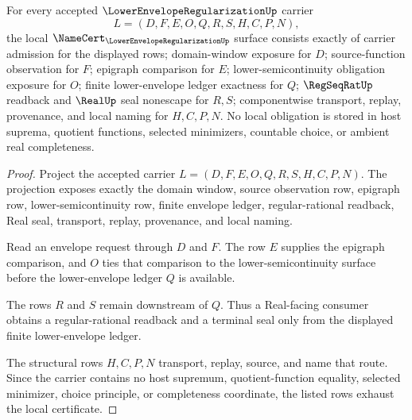 \begin{theorem}
\label{thm:lower-envelope-regularization-namecert-obligations}
For every accepted $\LowerEnvelopeRegularizationUp$ carrier
$$
L=(D,F,E,O,Q,R,S,H,C,P,N),
$$
the local $\NameCert_{\LowerEnvelopeRegularizationUp}$ surface consists exactly of carrier admission for the displayed rows; domain-window exposure for $D$; source-function observation for $F$; epigraph comparison for $E$; lower-semicontinuity obligation exposure for $O$; finite lower-envelope ledger exactness for $Q$; $\RegSeqRatUp$ readback and $\RealUp$ seal nonescape for $R,S$; componentwise transport, replay, provenance, and local naming for $H,C,P,N$. No local obligation is stored in host suprema, quotient functions, selected minimizers, countable choice, or ambient real completeness.
\end{theorem}
\begin{proof}
Project the accepted carrier $L=(D,F,E,O,Q,R,S,H,C,P,N)$. The projection exposes exactly the domain window, source observation row, epigraph row, lower-semicontinuity row, finite envelope ledger, regular-rational readback, Real seal, transport, replay, provenance, and local naming.

Read an envelope request through $D$ and $F$. The row $E$ supplies the epigraph comparison, and $O$ ties that comparison to the lower-semicontinuity surface before the lower-envelope ledger $Q$ is available.

The rows $R$ and $S$ remain downstream of $Q$. Thus a Real-facing consumer obtains a regular-rational readback and a terminal seal only from the displayed finite lower-envelope ledger.

The structural rows $H,C,P,N$ transport, replay, source, and name that route. Since the carrier contains no host supremum, quotient-function equality, selected minimizer, choice principle, or completeness coordinate, the listed rows exhaust the local certificate.
\end{proof}

